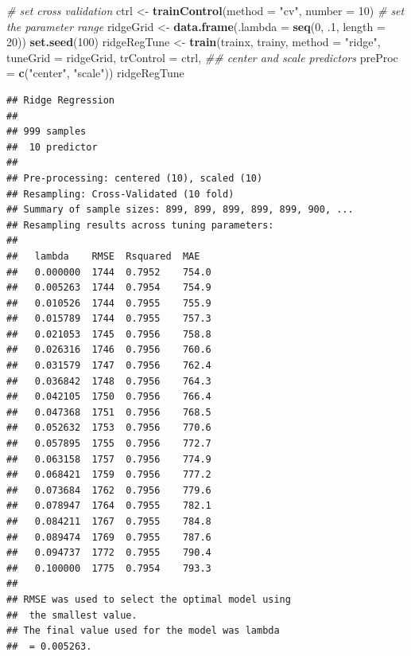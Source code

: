 \documentclass[12pt,]{krantz}
\makeatletter
\newenvironment{Shaded}{\begin{snugshade}}{\end{snugshade}}
\newcommand{\CommentTok}[1]{\textcolor[rgb]{0.37,0.37,0.37}{\textit{#1}}}
\newcommand{\DataTypeTok}[1]{\textcolor[rgb]{0.27,0.27,0.27}{#1}}
\newcommand{\DecValTok}[1]{\textcolor[rgb]{0.06,0.06,0.06}{#1}}
\newcommand{\FloatTok}[1]{\textcolor[rgb]{0.06,0.06,0.06}{#1}}
\newcommand{\KeywordTok}[1]{\textcolor[rgb]{0.27,0.27,0.27}{\textbf{#1}}}
\newcommand{\NormalTok}[1]{#1}
\newcommand{\StringTok}[1]{\textcolor[rgb]{0.5,0.5,0.5}{#1}}
\newenvironment{kframe}{%
\medskip{}
\setlength{\fboxsep}{.8em}
 \def\at@end@of@kframe{}%
 \ifinner\ifhmode%
  \def\at@end@of@kframe{\end{minipage}}%
  \begin{minipage}{\columnwidth}%
 \fi\fi%
 \def\FrameCommand##1{\hskip\@totalleftmargin \hskip-\fboxsep
 \colorbox{shadecolor}{##1}\hskip-\fboxsep
     \hskip-\linewidth \hskip-\@totalleftmargin \hskip\columnwidth}%
 \MakeFramed {\advance\hsize-\width
   \@totalleftmargin\z@ \linewidth\hsize
   \@setminipage}}%
 {\par\unskip\endMakeFramed%
 \at@end@of@kframe}
\renewenvironment{Shaded}{\begin{kframe}}{\end{kframe}}
\makeatother
\begin{document}
\begin{Shaded}
\begin{Highlighting}[]
\CommentTok{# set cross validation}
\NormalTok{ctrl <-}\StringTok{ }\KeywordTok{trainControl}\NormalTok{(}\DataTypeTok{method =} \StringTok{"cv"}\NormalTok{, }\DataTypeTok{number =} \DecValTok{10}\NormalTok{)}
\CommentTok{# set the parameter range }
\NormalTok{ridgeGrid <-}\StringTok{ }\KeywordTok{data.frame}\NormalTok{(}\DataTypeTok{.lambda =} \KeywordTok{seq}\NormalTok{(}\DecValTok{0}\NormalTok{, }\FloatTok{.1}\NormalTok{, }\DataTypeTok{length =} \DecValTok{20}\NormalTok{))}
\KeywordTok{set.seed}\NormalTok{(}\DecValTok{100}\NormalTok{)}
\NormalTok{ridgeRegTune <-}\StringTok{ }\KeywordTok{train}\NormalTok{(trainx, trainy,}
                      \DataTypeTok{method =} \StringTok{"ridge"}\NormalTok{,}
                      \DataTypeTok{tuneGrid =}\NormalTok{ ridgeGrid,}
                      \DataTypeTok{trControl =}\NormalTok{ ctrl,}
                      \CommentTok{## center and scale predictors}
                      \DataTypeTok{preProc =} \KeywordTok{c}\NormalTok{(}\StringTok{"center"}\NormalTok{, }\StringTok{"scale"}\NormalTok{))}
\NormalTok{ridgeRegTune}
\end{Highlighting}
\end{Shaded}

\begin{verbatim}
## Ridge Regression 
## 
## 999 samples
##  10 predictor
## 
## Pre-processing: centered (10), scaled (10) 
## Resampling: Cross-Validated (10 fold) 
## Summary of sample sizes: 899, 899, 899, 899, 899, 900, ... 
## Resampling results across tuning parameters:
## 
##   lambda    RMSE  Rsquared  MAE  
##   0.000000  1744  0.7952    754.0
##   0.005263  1744  0.7954    754.9
##   0.010526  1744  0.7955    755.9
##   0.015789  1744  0.7955    757.3
##   0.021053  1745  0.7956    758.8
##   0.026316  1746  0.7956    760.6
##   0.031579  1747  0.7956    762.4
##   0.036842  1748  0.7956    764.3
##   0.042105  1750  0.7956    766.4
##   0.047368  1751  0.7956    768.5
##   0.052632  1753  0.7956    770.6
##   0.057895  1755  0.7956    772.7
##   0.063158  1757  0.7956    774.9
##   0.068421  1759  0.7956    777.2
##   0.073684  1762  0.7956    779.6
##   0.078947  1764  0.7955    782.1
##   0.084211  1767  0.7955    784.8
##   0.089474  1769  0.7955    787.6
##   0.094737  1772  0.7955    790.4
##   0.100000  1775  0.7954    793.3
## 
## RMSE was used to select the optimal model using
##  the smallest value.
## The final value used for the model was lambda
##  = 0.005263.
\end{verbatim}
\end{document}
